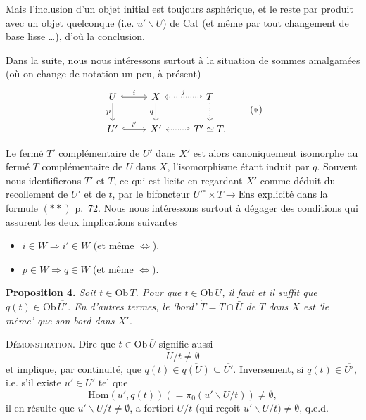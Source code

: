 \documentclass[11pt]{article}
\newcommand{\printedpage}[1]{\marginpar{\footnotesize p.~#1}}
\newcommand{\msp}[1]{\marginpar{\footnotesize [#1]}}
\newcommand{\Ob}{\mathrm{Ob}\,}
\newcommand{\Hom}{\mathrm{Hom}}
\begin{document}
\printedpage{53}

\msp{page 74}
Mais l'inclusion d'un objet initial est toujours asphérique, et le reste par produit avec un objet quelconque (i.e. $u'\backslash U$) de Cat (et même par tout changement de base lisse \dots), d'où la conclusion.

Dans la suite, nous nous intéressons surtout à la situation de sommes amalgamées (où on change de notation un peu, à présent)
\[
\begin{tikzcd}
U \arrow[r, hook, "i"] \arrow[d, "p"'] & X \arrow[d, "q"'] & T \arrow[l, hook', dotted, "j"'] \arrow[d, dotted] \\
U' \arrow[r, hook, "i'"] & X' & T' \simeq T. \arrow[l, hook', dotted]
\end{tikzcd}
\tag*{$(*)$}
\]

Le fermé $T'$ complémentaire de $U'$ dans $X'$ est alors canoniquement isomorphe au fermé $T$ complémentaire de $U$ dans $X$, l'isomorphisme étant induit par $q$. Souvent nous identifierons $T'$ et $T$, ce qui est licite en regardant $X'$ comme déduit du recollement de $U'$ et de $t$, par le bifoncteur $U'^{\circ}\times T\longrightarrow \mathrm{Ens}$ explicité dans la formule $(**)$ p.~72. Nous nous intéressons surtout à dégager des conditions qui assurent les deux implications suivantes

\begin{itemize}
\item[a)] $i\in W\Longrightarrow i'\in W$ (et même $\Longleftrightarrow$).
\item[b)] $p\in W\Longrightarrow q\in W$ (et même $\Longleftrightarrow$).
\end{itemize}

\msp{page 75}
\textbf{Proposition 4.} \textit{Soit $t\in\Ob T$. Pour que $t\in\Ob\bar{U}$, il faut et il suffit que $q(t)\in\Ob\overline{U'}$. En d'autres termes, le `bord' $\dot{T}=T\cap\bar{U}$ de $T$ dans $X$ est `le même' que son bord dans $X'$.}

\textsc{Démonstration}. Dire que $t\in\Ob\bar{U}$ signifie aussi
\[
U/t\neq\emptyset
\]
et implique, par continuité, que $q(t)\in\overline{q(U)}\subseteq\overline{U'}$. Inversement, si $q(t)\in\overline{U'}$, i.e. s'il existe $u'\in U'$ tel que
\[
\Hom(u',q(t))(=\pi_0(u'\backslash U/t))\neq\emptyset,
\]
il en résulte que $u'\backslash U/t\neq\emptyset$, a fortiori $U/t$ (qui reçoit $u'\backslash U/t)\neq\emptyset$, q.e.d.
\end{document}
